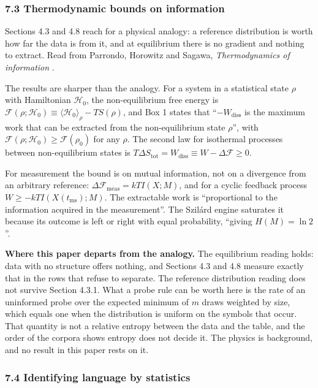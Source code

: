 \subsubsection{7.3 Thermodynamic bounds on information}

Sections 4.3 and 4.8 reach for a physical analogy: a reference distribution is worth how far the data is from it, and at equilibrium there is no gradient and nothing to extract. Read from Parrondo, Horowitz and Sagawa, \emph{Thermodynamics of information} \cite{src:Parrondo}.

The results are sharper than the analogy. For a system in a statistical state \(\rho\) with Hamiltonian \(\mathcal{H}_0\), the non-equilibrium free energy is \(\mathcal{F}(\rho;\mathcal{H}_0) \equiv \langle \mathcal{H}_0\rangle_\rho - TS(\rho)\), and Box 1 states that ``\(-W_{\text{diss}}\) is the maximum work that can be extracted from the non-equilibrium state \(\rho\)'', with \(\mathcal{F}(\rho;\mathcal{H}_0) \ge \mathcal{F}(\rho_0)\) for any \(\rho\). The second law for isothermal processes between non-equilibrium states is \(T\Delta S_{\text{tot}} = W_{\text{diss}} \equiv W - \Delta\mathcal{F} \ge 0\).

For measurement the bound is on mutual information, not on a divergence from an arbitrary reference: \(\Delta \mathcal{F}_{\text{meas}} = kTI(X;M)\), and for a cyclic feedback process \(W \ge -kTI(X(t_{\text{ms}});M)\). The extractable work is ``proportional to the information acquired in the measurement''. The Szilárd engine saturates it because its outcome is left or right with equal probability, ``giving \(H(M) = \ln 2\)''.

\noindent\textbf{Where this paper departs from the analogy.} The equilibrium reading holds: data with no structure offers nothing, and Sections 4.3 and 4.8 measure exactly that in the rows that refuse to separate. The reference distribution reading does not survive Section 4.3.1. What a probe rule can be worth here is the rate of an uninformed probe over the expected minimum of \(m\) draws weighted by size, which equals one when the distribution is uniform on the symbols that occur. That quantity is not a relative entropy between the data and the table, and the order of the corpora shows entropy does not decide it. The physics is background, and no result in this paper rests on it.

\subsubsection{7.4 Identifying language by statistics}

